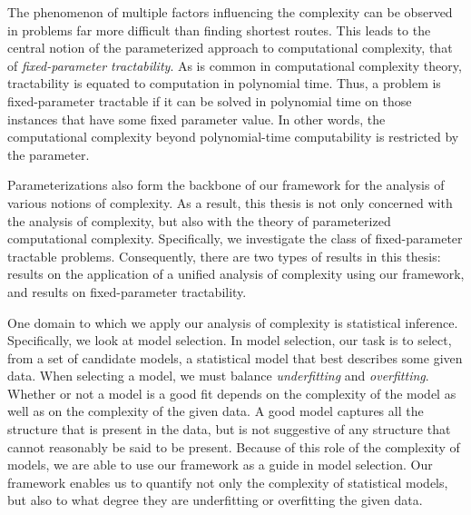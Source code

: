 The phenomenon of multiple factors influencing the complexity can be observed in problems far more difficult than finding shortest routes.
This leads to the central notion of the parameterized approach to computational complexity, that of \emph{fixed-parameter tractability}.
As is common in computational complexity theory, tractability is equated to computation in polynomial time.
Thus, a problem is fixed-parameter tractable if it can be solved in polynomial time on those instances that have some fixed parameter value.
In other words, the computational complexity beyond polynomial-time computability is restricted by the parameter.

Parameterizations also form the backbone of our framework for the analysis of various notions of complexity.
As a result, this thesis is not only concerned with the analysis of complexity, but also with the theory of parameterized computational complexity.
Specifically, we investigate the class of fixed-parameter tractable problems.
Consequently, there are two types of results in this thesis: results on the application of a unified analysis of complexity using our framework, and results on fixed-parameter tractability.

One domain to which we apply our analysis of complexity is statistical inference.
Specifically, we look at model selection.
In model selection, our task is to select, from a set of candidate models, a statistical model that best describes some given data.
When selecting a model, we must balance \emph{underfitting} and \emph{overfitting}.
Whether or not a model is a good fit depends on the complexity of the model as well as on the complexity of the given data.
A good model captures all the structure that is present in the data, but is not suggestive of any structure that cannot reasonably be said to be present.
Because of this role of the complexity of models, we are able to use our framework as a guide in model selection.
Our framework enables us to quantify not only the complexity of statistical models, but also to what degree they are underfitting or overfitting the given data.

